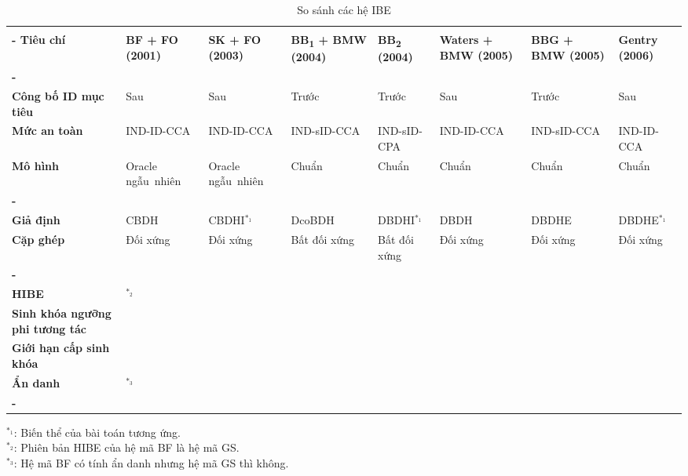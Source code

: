 \baselineskip
\small
\begin{longtabu}{| >{\bfseries\centering}p{2cm} X[c] X[c] X[c] X[c] X[c] X[c] X[c] |}
	\captionsetup{font=normalsize}
	\caption{So sánh các hệ IBE} \\
	\tabucline[4pt]-
	\everyrow{\tabucline[1pt]-}
	Tiêu chí &
	\bfseries BF 					\newline + FO 	\newline (2001) &
	\bfseries SK 					\newline + FO 	\newline (2003) &
	\bfseries BB\textsubscript{1} 	\newline + BMW 	\newline (2004) &
	\bfseries BB\textsubscript{2} 	\newline		\newline (2004) &
	\bfseries Waters 				\newline + BMW 	\newline (2005) &
	\bfseries BBG 					\newline + BMW 	\newline (2005) &
	\bfseries Gentry 				\newline		\newline (2006) \\
	\tabucline[1pt]-
	 \\
	Công bố ID mục tiêu 	& Sau 					& Sau 					& Trước 		& Trước 		& Sau 			& Trước 		& Sau 				\\
	Mức an toàn 			& IND-ID-CCA 			& IND-ID-CCA 			& IND-sID-CCA 	& IND-sID-CPA 	& IND-ID-CCA 	& IND-sID-CCA 	& IND-ID-CCA 	\\
	Mô hình 				& Oracle ngẫu~nhiên 	& Oracle ngẫu~nhiên 	& Chuẩn 		& Chuẩn 		& Chuẩn 		& Chuẩn 		& Chuẩn 			\\
	\tabucline[1pt]-
	 \\
	Giả định 				& CBDH 					& CBDHI$^{*_1}$ 		& DcoBDH 			& DBDHI$^{*_1}$ & DBDH 			& DBDHE 		& DBDHE$^{*_1}$ \\
	Cặp ghép				& Đối xứng 				& Đối xứng 		& Bất đối xứng 	& Bất đối xứng 	& Đối xứng 		& Đối xứng 		& Đối xứng 		\\
	\tabucline[1pt]-
	 \\
	HIBE 							& \checkmark$^{*_2}$ 	& & \checkmark 	& & \checkmark 	& \checkmark 	& 				\\
	Sinh khóa ngưỡng phi tương tác 	& \checkmark 			& & \checkmark 	& & \checkmark 	& \checkmark 	& 				\\
	Giới hạn cấp sinh khóa 			& 						& & 			& & 			& \checkmark 	& 				\\
	Ẩn danh 						& \checkmark$^{*_3}$ 	& & 			& & 			& 				& \checkmark 	\\
	\tabucline[2pt]-
\end{longtabu}
\vspace{-\baselineskip}
$^{*_1}$: Biến thể của bài toán tương ứng. \\
\indent $^{*_2}$: Phiên bản HIBE của hệ mã BF là hệ mã GS. \\
\indent $^{*_3}$: Hệ mã BF có tính ẩn danh nhưng hệ mã GS thì không.
\normalsize